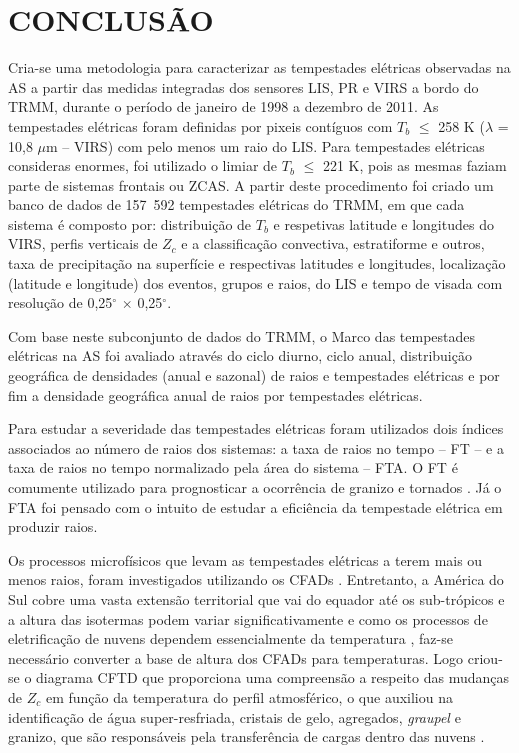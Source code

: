 \chapter{CONCLUSÃO}

Cria-se uma metodologia para caracterizar as tempestades elétricas observadas na AS a partir das medidas integradas dos sensores LIS, PR e VIRS a bordo do TRMM, durante o período de janeiro de 1998 a dezembro de 2011. As tempestades elétricas foram definidas por pixeis contíguos com $T_b$ $\leq$ 258 K ($\lambda$ = 10,8 $\mu$m -- VIRS) com pelo menos um raio do LIS. Para tempestades elétricas consideras enormes, foi utilizado o limiar de $T_b$ $\leq$ 221 K, pois as mesmas faziam parte de sistemas frontais ou ZCAS. A partir deste procedimento foi criado um banco de dados de 157~592 tempestades elétricas do TRMM, em que cada sistema é composto por: distribuição de $T_b$ e respetivas latitude e longitudes do VIRS, perfis verticais de $Z_c$ e a classificação convectiva, estratiforme e outros, taxa de precipitação na superfície e respectivas latitudes e longitudes, localização (latitude e longitude) dos eventos, grupos e raios, do LIS e tempo de visada com resolução de 0,25$^{\circ}$ $\times$ 0,25$^{\circ}$.

Com base neste subconjunto de dados do TRMM, o Marco das tempestades elétricas na AS foi avaliado através  do ciclo diurno, ciclo anual, distribuição geográfica de densidades (anual e sazonal) de raios e tempestades elétricas e por fim a densidade geográfica anual de raios por tempestades elétricas.  

Para estudar a severidade das tempestades elétricas foram utilizados dois índices associados ao número de raios dos sistemas: a taxa de raios no tempo -- FT -- e a taxa de raios no tempo normalizado pela área do sistema -- FTA. O FT é comumente utilizado  para prognosticar a ocorrência de granizo e tornados \cite{williams1999,goodman1988,schultz2011,gatlin2010}. Já o FTA foi pensado com o intuito de estudar a eficiência da tempestade elétrica em produzir raios. 


Os processos microfísicos que levam as tempestades elétricas a terem mais ou menos raios, foram investigados utilizando os CFADs \cite{yuter1995}. Entretanto, a América do Sul cobre uma vasta extensão territorial que vai do equador até os sub-trópicos e a altura das isotermas podem variar significativamente e como os processos de eletrificação de nuvens  dependem essencialmente da temperatura \cite{Takahashi1978}, faz-se necessário converter a base de altura dos CFADs para temperaturas. Logo criou-se o diagrama CFTD que proporciona uma compreensão a respeito das mudanças de $Z_c$ em função da temperatura do perfil atmosférico, o que auxiliou na identificação de água super-resfriada, cristais de gelo, agregados, \textit{graupel} e granizo, que são responsáveis pela transferência de cargas dentro das nuvens \cite{Takahashi1978,saunders2008}.


